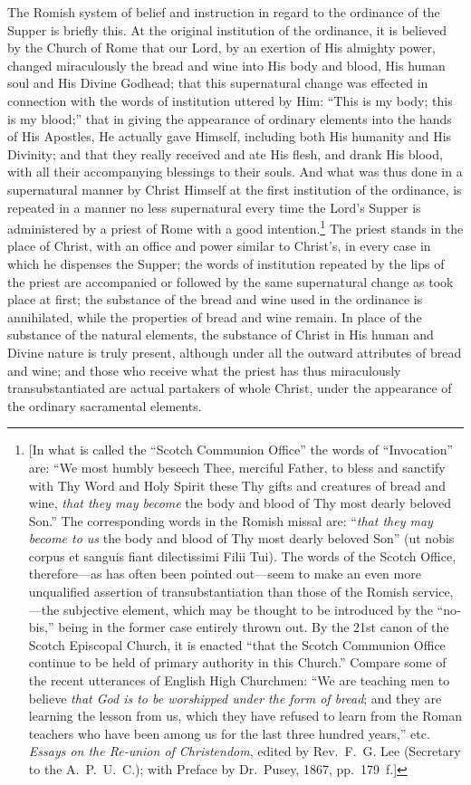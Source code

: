 \documentclass[
]{book}
\begin{document}
The Romish system of belief and instruction in regard to the ordinance of the Supper is briefly this. At the original institution of the ordinance, it is believed by the Church of Rome that our Lord, by an exertion of His almighty power, changed miraculously the bread and wine into His body and blood, His human soul and His Divine Godhead; that this supernatural change was effected in connection with the words of institution uttered by Him: ``This is my body; this is my blood;'' that in giving the appearance of ordinary elements into the hands of His Apostles, He actually gave Himself, including both His humanity and His Divinity; and that they really received and ate His flesh, and drank His blood, with all their accompanying blessings to their souls. And what was thus done in a supernatural manner by Christ Himself at the first institution of the ordinance, is repeated in a manner no less supernatural every time the Lord's Supper is administered by a priest of Rome with a good intention.\footnote{{[}In what is called the ``Scotch Communion Office'' the words of ``Invocation'' are: ``We most humbly beseech Thee, merciful Father, to bless and sanctify with Thy Word and Holy Spirit these Thy gifts and creatures of bread and wine, \emph{that they may become} the body and blood of Thy most dearly beloved Son.'' The corresponding words in the Romish missal are: ``\emph{that they may become to us} the body and blood of Thy most dearly beloved Son'' (\foreignlanguage{latin}{ut nobis corpus et sanguis fiant dilectissimi Filii Tui}). The words of the Scotch Office, therefore---as has often been pointed out---seem to make an even more unqualified assertion of transubstantiation than those of the Romish service,---the subjective element, which may be thought to be introduced by the ``\foreignlanguage{latin}{nobis},'' being in the former case entirely thrown out. By the 21st canon of the Scotch Episcopal Church, it is enacted ``that the Scotch Communion Office continue to be held of primary authority in this Church.'' Compare some of the recent utterances of English High Churchmen: ``We are teaching men to believe \emph{that God is to be worshipped under the form of bread}; and they are learning the lesson from us, which they have refused to learn from the Roman teachers who have been among us for the last three hundred years,'' etc. \emph{Essays on the Re-union of Christendom}, edited by Rev.~F.~G. Lee (Secretary to the A.~P.~U.~C.); with Preface by Dr.~Pusey, 1867, pp.~179~f.{]}} The priest stands in the place of Christ, with an office and power similar to Christ's, in every case in which he dispenses the Supper; the words of institution repeated by the lips of the priest are accompanied or followed by the same supernatural change as took place at first; the substance of the bread and wine used in the ordinance is annihilated, while the properties of bread and wine remain. In place of the substance of the natural elements, the substance of Christ in His human and Divine nature is truly present, although under all the outward attributes of bread and wine; and those who receive what the priest has thus miraculously transubstantiated are actual partakers of whole Christ, under the appearance of the ordinary sacramental elements.
\end{document}
